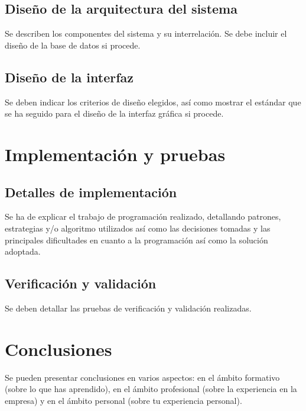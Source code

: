 \documentclass[pdftex,11pt,a4paper]{book}
\begin{document}

\section{Diseño de la arquitectura del sistema}

Se describen los componentes del sistema y su interrelación. Se debe incluir el diseño de la base de datos si procede.

\section{Diseño de la interfaz}

Se deben indicar los criterios de diseño elegidos, así como mostrar el estándar que se ha seguido para el diseño de la interfaz gráfica si procede.

\chapter{Implementación y pruebas}

\section{Detalles de implementación}

Se ha de explicar el trabajo de programación realizado, detallando patrones, estrategias y/o algoritmo utilizados así como las decisiones tomadas y las principales dificultades en cuanto a la programación así como la solución adoptada. 

\section{Verificación y validación}

Se deben detallar las pruebas de verificación y validación realizadas.

\chapter{Conclusiones}
Se pueden presentar conclusiones en varios aspectos: en el ámbito formativo (sobre lo que has aprendido), en el ámbito profesional (sobre la experiencia en la empresa) y en el ámbito personal (sobre tu experiencia personal).






\end{document}

